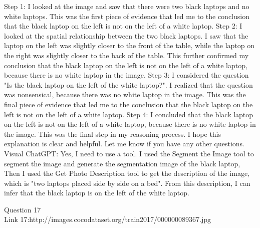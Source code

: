 \begin{enumerate}
        Step 1: I looked at the image and saw that there were two black laptops and no white laptops. This was the first piece of evidence that led me to the conclusion that the black laptop on the left is not on the left of a white laptop.
        Step 2: I looked at the spatial relationship between the two black laptops. I saw that the laptop on the left was slightly closer to the front of the table, while the laptop on the right was slightly closer to the back of the table. This further confirmed my conclusion that the black laptop on the left is not on the left of a white laptop, because there is no white laptop in the image.
        Step 3: I considered the question "Is the black laptop on the left of the white laptop?". I realized that the question was nonsensical, because there was no white laptop in the image. This was the final piece of evidence that led me to the conclusion that the black laptop on the left is not on the left of a white laptop.
        Step 4: I concluded that the black laptop on the left is not on the left of a white laptop, because there is no white laptop in the image. This was the final step in my reasoning process.
        I hope this explanation is clear and helpful. Let me know if you have any other questions.
        \subitem Visual ChatGPT: Yes, I need to use a tool. I used the Segment the Image tool to segment the image and generate the segmentation image of the black laptop, Then I used the Get Photo Description tool to get the description of the image, which is "two laptops placed side by side on a bed". From this description, I can infer that the black laptop is on the left of the white laptop.
    \end{enumerate}
Question 17\\
Link 17:http://images.cocodataset.org/train2017/000000089367.jpg

